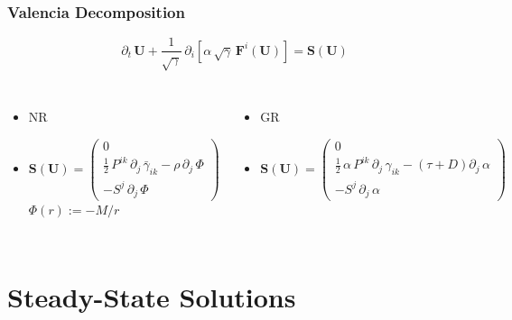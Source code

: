 \documentclass{beamer}
\newcommand{\p}{\partial}
\newcommand{\bs}{\boldsymbol}
\begin{document}
\begin{frame}
\frametitle{Valencia Decomposition}

  \begin{equation*}
    \p_{t}\,\bs{U}
    +\frac{1}{\sqrt{\gamma}}\,
    \p_{i}\left[\alpha\,\sqrt{\gamma}\,\bs{F}^{i}\left(\bs{U}\right)\right]
    =\bs{S}\left(\bs{U}\right)
  \end{equation*}

\Fontvi

  \begin{columns}[c]


      \begin{itemize}
        \item[]
          NR
        \item[]
          $\bs{S}\left(\bs{U}\right)=
          \begin{pmatrix}
          0 \\[1em]
          \frac{1}{2}\,P^{ik}\,\p_{j}\,\bar{\gamma}_{ik}
            -\rho\,\p_{j}\,\Phi \\[1em]
          -S^{j}\,\p_{j}\,\Phi
          \end{pmatrix}$
          $\Phi\left(r\right):=-M/r$
      \end{itemize}


      \begin{itemize}
        \item[]
          GR
        \item[]
          $\bs{S}\left(\bs{U}\right)=
          \begin{pmatrix}
          0 \\[1em]
          \frac{1}{2}\,\alpha\,P^{ik}\,\p_{j}\,\gamma_{ik}
            -\left(\tau+D\right)\p_{j}\,\alpha \\[1em]
          -S^{j}\,\p_{j}\,\alpha
          \end{pmatrix}$
      \end{itemize}

  \end{columns}

\end{frame}

\section{Steady-State Solutions}
\end{document}
